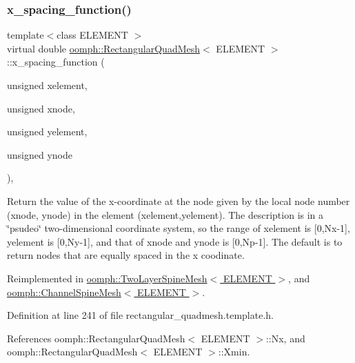 \subsubsection{\texorpdfstring{x\+\_\+spacing\+\_\+function()}{x\_spacing\_function()}}
{\footnotesize\ttfamily template$<$class E\+L\+E\+M\+E\+NT $>$ \\
virtual double \hyperlink{classoomph_1_1RectangularQuadMesh}{oomph\+::\+Rectangular\+Quad\+Mesh}$<$ E\+L\+E\+M\+E\+NT $>$\+::x\+\_\+spacing\+\_\+function (\begin{DoxyParamCaption}\item[{unsigned}]{xelement,  }\item[{unsigned}]{xnode,  }\item[{unsigned}]{yelement,  }\item[{unsigned}]{ynode }\end{DoxyParamCaption})\hspace{0.3cm}{\ttfamily [inline]}, {\ttfamily [virtual]}}



Return the value of the x-\/coordinate at the node given by the local node number (xnode, ynode) in the element (xelement,yelement). The description is in a \char`\"{}psudeo\char`\"{} two-\/dimensional coordinate system, so the range of xelement is \mbox{[}0,Nx-\/1\mbox{]}, yelement is \mbox{[}0,Ny-\/1\mbox{]}, and that of xnode and ynode is \mbox{[}0,Np-\/1\mbox{]}. The default is to return nodes that are equally spaced in the x coodinate. 



Reimplemented in \hyperlink{classoomph_1_1TwoLayerSpineMesh_a5fd9eae27ba19788e0b397936f0c5ead}{oomph\+::\+Two\+Layer\+Spine\+Mesh$<$ E\+L\+E\+M\+E\+N\+T $>$}, and \hyperlink{classoomph_1_1ChannelSpineMesh_a16e0d4264443b1beb274753b0d6b970e}{oomph\+::\+Channel\+Spine\+Mesh$<$ E\+L\+E\+M\+E\+N\+T $>$}.



Definition at line 241 of file rectangular\+\_\+quadmesh.\+template.\+h.



References oomph\+::\+Rectangular\+Quad\+Mesh$<$ E\+L\+E\+M\+E\+N\+T $>$\+::\+Nx, and oomph\+::\+Rectangular\+Quad\+Mesh$<$ E\+L\+E\+M\+E\+N\+T $>$\+::\+Xmin.

\mbox{\label{classoomph_1_1RectangularQuadMesh_a7d4a00a545efc20451b00a9b8ad1e17d}} 
